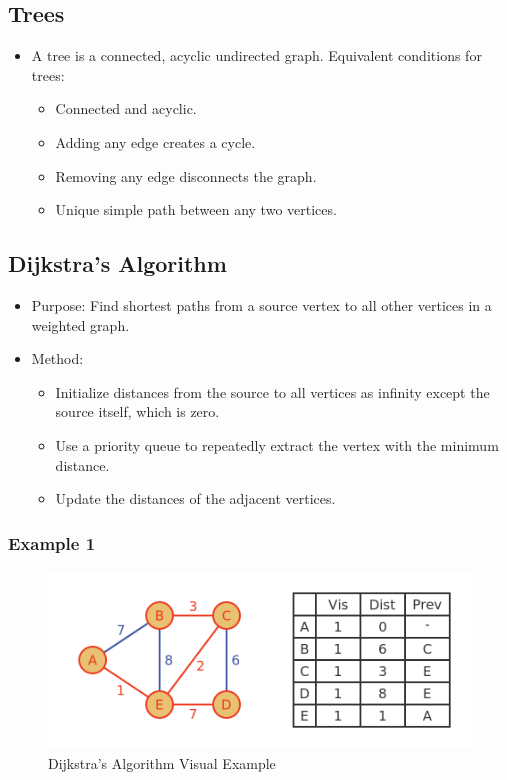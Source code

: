 \documentclass[8pt]{article}
\begin{document}
\subsection*{Trees}
\begin{itemize}
    \item A tree is a connected, acyclic undirected graph. Equivalent conditions for trees:
    \begin{itemize}
        \item Connected and acyclic.
        \item Adding any edge creates a cycle.
        \item Removing any edge disconnects the graph.
        \item Unique simple path between any two vertices.
    \end{itemize}
\end{itemize}
\newpage
\subsection{Dijkstra's Algorithm}
\begin{itemize}
    \item Purpose: Find shortest paths from a source vertex to all other vertices in a weighted graph.
    \item Method:
    \begin{itemize}
        \item Initialize distances from the source to all vertices as infinity except the source itself, which is zero.
        \item Use a priority queue to repeatedly extract the vertex with the minimum distance.
        \item Update the distances of the adjacent vertices.
    \end{itemize}
\end{itemize}

\subsubsection*{Example 1}
\begin{figure}[h]
    \centering
    \includegraphics[width=0.5\linewidth]{images/algorithm-5.png}
    \caption{Dijkstra's Algorithm Visual Example}
    \label{fig:enter-label}
\end{figure}
\end{document}
